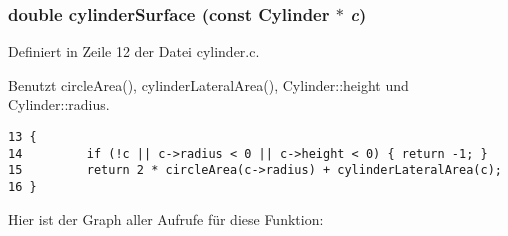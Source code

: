 \subsubsection{\setlength{\rightskip}{0pt plus 5cm}double cylinder\-Surface (const {\bf Cylinder} $\ast$ {\em c})}\label{src_2cylinder_8h_064d77300d0537b11e9d104340f2f959}




Definiert in Zeile 12 der Datei cylinder.c.

Benutzt circle\-Area(), cylinder\-Lateral\-Area(), Cylinder::height und Cylinder::radius.

\footnotesize\begin{verbatim}13 {
14         if (!c || c->radius < 0 || c->height < 0) { return -1; }
15         return 2 * circleArea(c->radius) + cylinderLateralArea(c);
16 }
\end{verbatim}\normalsize 




Hier ist der Graph aller Aufrufe f\"{u}r diese Funktion:
